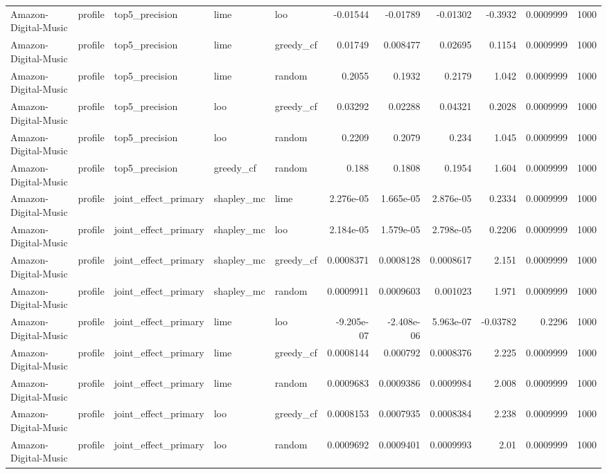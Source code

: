 \begin{table}[t]
\begin{tabular}{lllllrrrrrr}
Amazon-Digital-Music & profile & top5\_precision & lime & loo & -0.01544 & -0.01789 & -0.01302 & -0.3932 & 0.0009999 & 1000 \\
Amazon-Digital-Music & profile & top5\_precision & lime & greedy\_cf & 0.01749 & 0.008477 & 0.02695 & 0.1154 & 0.0009999 & 1000 \\
Amazon-Digital-Music & profile & top5\_precision & lime & random & 0.2055 & 0.1932 & 0.2179 & 1.042 & 0.0009999 & 1000 \\
Amazon-Digital-Music & profile & top5\_precision & loo & greedy\_cf & 0.03292 & 0.02288 & 0.04321 & 0.2028 & 0.0009999 & 1000 \\
Amazon-Digital-Music & profile & top5\_precision & loo & random & 0.2209 & 0.2079 & 0.234 & 1.045 & 0.0009999 & 1000 \\
Amazon-Digital-Music & profile & top5\_precision & greedy\_cf & random & 0.188 & 0.1808 & 0.1954 & 1.604 & 0.0009999 & 1000 \\
Amazon-Digital-Music & profile & joint\_effect\_primary & shapley\_mc & lime & 2.276e-05 & 1.665e-05 & 2.876e-05 & 0.2334 & 0.0009999 & 1000 \\
Amazon-Digital-Music & profile & joint\_effect\_primary & shapley\_mc & loo & 2.184e-05 & 1.579e-05 & 2.798e-05 & 0.2206 & 0.0009999 & 1000 \\
Amazon-Digital-Music & profile & joint\_effect\_primary & shapley\_mc & greedy\_cf & 0.0008371 & 0.0008128 & 0.0008617 & 2.151 & 0.0009999 & 1000 \\
Amazon-Digital-Music & profile & joint\_effect\_primary & shapley\_mc & random & 0.0009911 & 0.0009603 & 0.001023 & 1.971 & 0.0009999 & 1000 \\
Amazon-Digital-Music & profile & joint\_effect\_primary & lime & loo & -9.205e-07 & -2.408e-06 & 5.963e-07 & -0.03782 & 0.2296 & 1000 \\
Amazon-Digital-Music & profile & joint\_effect\_primary & lime & greedy\_cf & 0.0008144 & 0.000792 & 0.0008376 & 2.225 & 0.0009999 & 1000 \\
Amazon-Digital-Music & profile & joint\_effect\_primary & lime & random & 0.0009683 & 0.0009386 & 0.0009984 & 2.008 & 0.0009999 & 1000 \\
Amazon-Digital-Music & profile & joint\_effect\_primary & loo & greedy\_cf & 0.0008153 & 0.0007935 & 0.0008384 & 2.238 & 0.0009999 & 1000 \\
Amazon-Digital-Music & profile & joint\_effect\_primary & loo & random & 0.0009692 & 0.0009401 & 0.0009993 & 2.01 & 0.0009999 & 1000 \\

\end{tabular}
\end{table}
